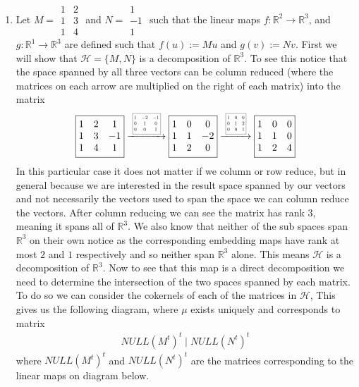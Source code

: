 \documentclass[12pt]{amsart}
\theoremstyle{definition}
\newcommand{\R}{\mathbb{R}}
\newcommand{\ra}{\rightarrow}
\begin{document}
\begin{enumerate}[start=0]
\item Let $M=\boxed{\begin{matrix}
    1 & 2\\
    1 & 3\\
    1 & 4
\end{matrix}}$ and $N=\boxed{\begin{matrix}
    1\\
    -1\\
    1
\end{matrix}}$ such that the linear maps $f:\R^2\ra\R^3$, and $g:\R^1\ra\R^3$ are defined such that $f(u):=Mu$ and $g(v):= Nv$. First we will show that $\mathcal{H}=\{M,N\}$ is a decomposition of $\R^3$. To see this notice that the space spanned by all three vectors can be column reduced (where the matrices on each arrow are multiplied on the right of each matrix) into the matrix
$$\boxed{\begin{matrix}
    1 & 2 & 1\\
    1 & 3 & -1\\
    1 & 4 & 1
\end{matrix}}
\xrightarrow{\scalebox{0.5}{\;
\boxed{\begin{matrix}
    1 & -2 & -1\\
    0 & 1 & 0\\
    0 & 0 & 1
\end{matrix}}\;}}
\boxed{\begin{matrix}
    1 & 0 & 0\\
    1 & 1 & -2\\
    1 & 2 & 0
\end{matrix}}
\xrightarrow{\scalebox{0.5}{\;
\boxed{\begin{matrix}
    1 & 0 & 0\\
    0 & 1 & 2\\
    0 & 0 & 1
\end{matrix}}\;}}
\boxed{\begin{matrix}
    1 & 0 & 0\\
    1 & 1 & 0\\
    1 & 2 & 4
\end{matrix}}$$
In this particular case it does not matter if we column or row reduce, but in general because we are interested in the result space spanned by our vectors and not necessarily the vectors used to span the space we can column reduce the vectors.
After column reducing we can see the matrix has rank $3$, meaning it spans all of $\R^3$.
We also know that neither of the sub spaces span $\R^3$ on their own notice as the corresponding embedding maps have rank at most $2$ and $1$ respectively and so neither span $\R^3$ alone. This means $\mathcal{H}$ is a decomposition of $\R^3$. Now to see that this map is a direct decomposition we need to determine the intersection of the two spaces spanned by each matrix. To do so we can consider the cokernels of each of the matrices in $\mathcal{H}$, This gives us the following diagram, where $\mu$ exists uniquely and corresponds to matrix $$\boxed{\begin{matrix}NULL(M^t)^t\;| \;NULL(N^t)^t\end{matrix}}$$
where $NULL(M^t)^t$ and $NULL(N^t)^t$ are the matrices corresponding to the linear maps on diagram below.


\end{enumerate}
\end{document}
